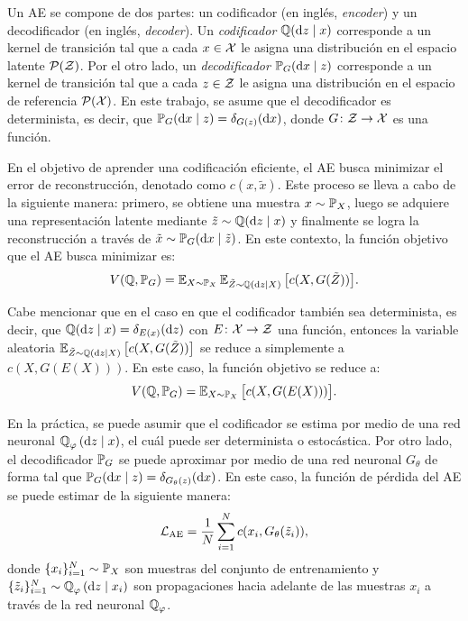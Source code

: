 Un AE se compone de dos partes: un codificador (en inglés, \textit{encoder}) y un decodificador (en inglés, \textit{decoder}).
Un \textit{codificador} $ \ProbQ(\dz \mid x)$ corresponde a un kernel de transición tal que a cada $x \in \cX$ le asigna una distribución en el espacio latente $ \ProbSpace[\cZ] $.
Por el otro lado, un \textit{decodificador} $\Prob_G(\dx \mid z)$ corresponde a un kernel de transición tal que a cada $z \in \cZ$ le asigna una distribución en el espacio de referencia $\ProbSpace[\cX]$.
En este trabajo, se asume que el decodificador es determinista, es decir, que $\Prob_G(\dx \mid z) = \delta_{G(z)}(\dx)$, donde $G\colon \cZ \to \cX$ es una función.

En el objetivo de aprender una codificación eficiente, el AE busca minimizar el error de reconstrucción, denotado como $c(x, \tilde x)$. Este proceso se lleva a cabo de la siguiente manera: primero, se obtiene una muestra $x\sim \Prob_X$, luego se adquiere una representación latente mediante $\tilde z \sim \ProbQ(\dz \mid x)$ y finalmente se logra la reconstrucción a través de $\tilde x \sim \Prob_G(\dx \mid \tilde z)$. En este contexto, la función objetivo que el AE busca minimizar es:
\begin{equation}\label{eq:ae-obj-func}
    V(\ProbQ, \Prob_G) = \Exp_{X \sim \Prob_X} \Exp_{\tilde Z \sim \ProbQ(\dz \mid X)} \qty\big[ c(X, G(\tilde Z)) ].
\end{equation}

Cabe mencionar que en el caso en que el codificador también sea determinista, es decir, que $\ProbQ(\dz \mid x) = \delta_{E(x)}(\dz)$ con $E\colon \cX \to \cZ$ una función, entonces la variable aleatoria
$\Exp_{\tilde Z \sim \ProbQ(\dz \mid X)} \qty\big[ c(X, G(\tilde Z)) ]$ se reduce a simplemente a $c(X, G(E(X)))$. En este caso, la función objetivo se reduce a:
\begin{equation}\label{eq:ae-obj-func-deterministic}
    V(\ProbQ, \Prob_G) = \Exp_{X \sim \Prob_X} \qty\big[ c(X, G(E(X))) ].
\end{equation}

En la práctica, se puede asumir que el codificador se estima por medio de una red neuronal $\ProbQ_\varphi \left( \dd z \mid x \right)$, el cuál puede ser determinista o estocástica. Por otro lado, el decodificador $\Prob_G$ se puede aproximar por medio de una red neuronal $G_\theta$ de forma tal que $\Prob_G(\dd x \mid z) = \delta_{G_\theta(z)}(\dd x)$.
En este caso, la función de pérdida del AE se puede estimar de la siguiente manera:
\begin{equation}
    \cL_{\mathrm{AE}} = \frac{1}{N}\sum_{i=1}^{N} c(x_i, G_\theta(\tilde z_i)),
\end{equation}
donde $\{x_i\}_{i=1}^{N} \sim \Prob_X$ son muestras del conjunto de entrenamiento y $\{\tilde z_i\}_{i=1}^{N} \sim \ProbQ_\varphi \left( \dd z \mid x_i \right)$ son propagaciones hacia adelante de las muestras $x_i$ a través de la red neuronal $\ProbQ_\varphi$.


